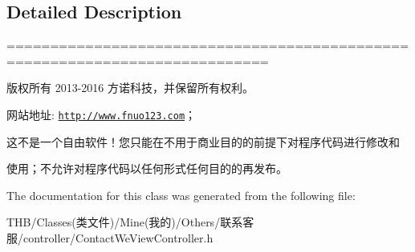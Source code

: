 \subsection{Detailed Description}
============================================================================

版权所有 2013-\/2016 方诺科技，并保留所有权利。

网站地址\+: \href{http://www.fnuo123.com}{\tt http\+://www.\+fnuo123.\+com}； 



这不是一个自由软件！您只能在不用于商业目的的前提下对程序代码进行修改和

使用；不允许对程序代码以任何形式任何目的的再发布。 

 

The documentation for this class was generated from the following file\+:\begin{DoxyCompactItemize}
\item 
T\+H\+B/\+Classes(类文件)/\+Mine(我的)/\+Others/联系客服/controller/Contact\+We\+View\+Controller.\+h\end{DoxyCompactItemize}
